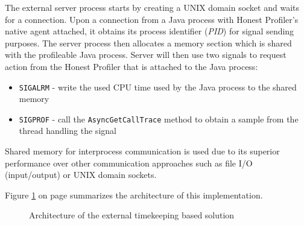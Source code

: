 \documentclass[..thesis.tex]{subfiles}
\begin{document}
The external server process starts by creating a UNIX domain socket and waits for a connection. Upon a connection from a Java process with Honest Profiler's native agent attached, it obtains its process identifier (\textit{PID}) for signal sending purposes. The server process then allocates a memory section which is shared with the profileable Java process. Server will then use two signals to request action from the Honest Profiler that is attached to the Java process:

\begin{itemize}
	\item \texttt{SIGALRM} - write the used CPU time used by the Java process to the shared memory
	\item \texttt{SIGPROF} - call the \texttt{Async\-Get\-Call\-Trace} method to obtain a sample from the thread handling the signal
\end{itemize}

Shared memory for interprocess communication is used due to its superior performance over other communication approaches such as file I/O (input/output) or UNIX domain sockets. 

Figure \ref{fig:shared_mem_arctitecture} on page \pageref{fig:shared_mem_arctitecture} summarizes the architecture of this implementation.
\begin{figure}[h]
\centering
{}
\caption{Architecture of the external timekeeping based solution}
\label{fig:shared_mem_arctitecture}
\end{figure}
\end{document}
